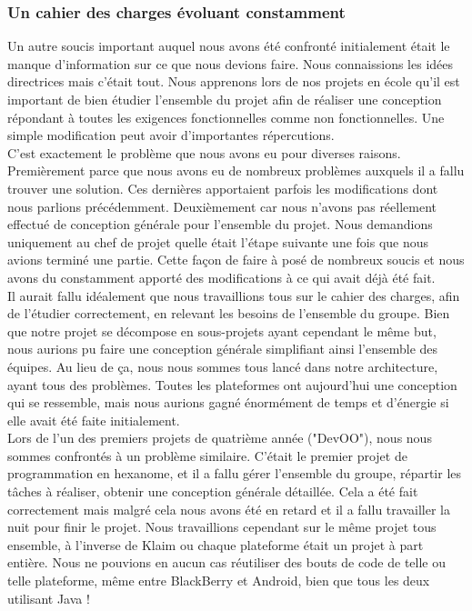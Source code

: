 \documentclass{article}
\begin{document}
\subsubsection{Un cahier des charges évoluant constamment}
		Un autre soucis important auquel nous avons été confronté initialement était le manque d'information sur ce que nous devions faire. Nous connaissions les idées directrices mais c'était tout. Nous apprenons lors de nos projets en école qu'il est important de bien étudier l'ensemble du projet afin de réaliser une conception répondant à toutes les exigences fonctionnelles comme non fonctionnelles. Une simple modification peut avoir d'importantes répercutions. \\
			
		C'est exactement le problème que nous avons eu pour diverses raisons. Premièrement parce que nous avons eu de nombreux problèmes auxquels il a fallu trouver une solution. Ces dernières apportaient parfois les modifications dont nous parlions précédemment. Deuxièmement car nous n'avons pas réellement effectué de conception générale pour l'ensemble du projet. Nous demandions uniquement au chef de projet quelle était l'étape suivante une fois que nous avions terminé une partie. Cette façon de faire à posé de nombreux soucis et nous avons du constamment apporté des modifications à ce qui avait déjà été fait.\\
		
		Il aurait fallu idéalement que nous travaillions tous sur le cahier des charges, afin de l'étudier correctement, en relevant les besoins de l'ensemble du groupe. Bien que notre projet se décompose en sous-projets ayant cependant le même but, nous aurions pu faire une conception générale simplifiant ainsi l'ensemble des équipes. Au lieu de ça, nous nous sommes tous lancé dans notre architecture, ayant tous des problèmes. Toutes les plateformes ont aujourd'hui une conception qui se ressemble, mais nous aurions gagné énormément de temps et d'énergie si elle avait été faite initialement. \\
		
		Lors de l'un des premiers projets de quatrième année ("DevOO"), nous nous sommes confrontés à un problème similaire. C'était le premier projet de programmation en hexanome, et il a fallu gérer l'ensemble du groupe, répartir les tâches à réaliser, obtenir une conception générale détaillée. Cela a été fait correctement mais malgré cela nous avons été en retard et il a fallu travailler la nuit pour finir le projet. Nous travaillions cependant sur le même projet tous ensemble, à l'inverse de Klaim ou chaque plateforme était un projet à part entière. Nous ne pouvions en aucun cas réutiliser des bouts de code de telle ou telle plateforme, même entre BlackBerry et Android, bien que tous les deux utilisant Java !\\
		
\end{document}
